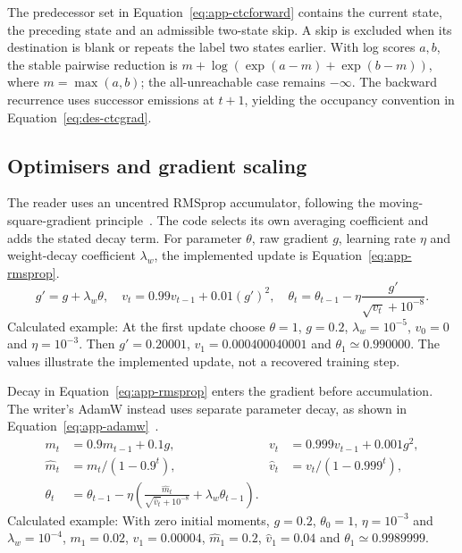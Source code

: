 The predecessor set in Equation~\ref{eq:app-ctcforward} contains the current state, the preceding state and an admissible two-state skip. A skip is excluded when its destination is blank or repeats the label two states earlier. With log scores $a,b$, the stable pairwise reduction is $m+\log(\exp(a-m)+\exp(b-m))$, where $m=\max(a,b)$; the all-unreachable case remains $-\infty$. The backward recurrence uses successor emissions at $t+1$, yielding the occupancy convention in Equation~\ref{eq:des-ctcgrad}.

\subsection{Optimisers and gradient scaling}
The reader uses an uncentred RMSprop accumulator, following the moving-square-gradient principle~\cite[PDF p.~29]{tieleman2012}. The code selects its own averaging coefficient and adds the stated decay term. For parameter $\theta$, raw gradient $g$, learning rate $\eta$ and weight-decay coefficient $\lambda_w$, the implemented update is Equation~\ref{eq:app-rmsprop}.
\begin{equation}
g' =g+\lambda_w\theta,\quad
v_t=0.99v_{t-1}+0.01(g')^2,\quad
\theta_t=\theta_{t-1}-\eta\frac{g'}{\sqrt{v_t}+10^{-8}}.
\label{eq:app-rmsprop}
\end{equation}
Calculated example: At the first update choose $\theta=1$, $g=0.2$, $\lambda_w=10^{-5}$, $v_0=0$ and $\eta=10^{-3}$. Then $g\prime=0.20001$, $v_1=0.000400040001$ and $\theta_1\simeq0.990000$. The values illustrate the implemented update, not a recovered training step.

Decay in Equation~\ref{eq:app-rmsprop} enters the gradient before accumulation. The writer's AdamW instead uses separate parameter decay, as shown in Equation~\ref{eq:app-adamw}~\cite[p.~2, Alg.~1]{kingma2015}\cite[p.~3, Alg.~2]{loshchilov2019}.
\begin{equation}
\begin{aligned}
m_t&=0.9m_{t-1}+0.1g,& v_t&=0.999v_{t-1}+0.001g^2,\\
\widehat m_t&=m_t/(1-0.9^t),&\widehat v_t&=v_t/(1-0.999^t),\\
\theta_t&=\theta_{t-1}-\eta\left(\frac{\widehat m_t}{\sqrt{\widehat v_t}+10^{-8}}+\lambda_w\theta_{t-1}\right).
\end{aligned}
\label{eq:app-adamw}
\end{equation}
Calculated example: With zero initial moments, $g=0.2$, $\theta_0=1$, $\eta=10^{-3}$ and $\lambda_w=10^{-4}$, $m_1=0.02$, $v_1=0.00004$, $\widehat m_1=0.2$, $\widehat v_1=0.04$ and $\theta_1\simeq0.9989999$.

